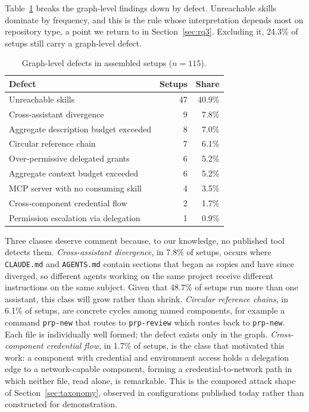 \documentclass[conference]{IEEEtran}
\begin{document}
Table~\ref{tab:setupscope} breaks the graph-level findings down by defect.
Unreachable skills dominate by frequency, and this is the rule whose
interpretation depends most on repository type, a point we return to in
Section~\ref{sec:rq3}. Excluding it, 24.3\% of setups still carry a graph-level
defect.

\begin{table}[t]
\caption{Graph-level defects in assembled setups ($n=115$).}
\label{tab:setupscope}
\centering
\small
\begin{tabular}{lrr}
\toprule
Defect & Setups & Share \\
\midrule
Unreachable skills                    & 47 & 40.9\% \\
Cross-assistant divergence            &  9 &  7.8\% \\
Aggregate description budget exceeded &  8 &  7.0\% \\
Circular reference chain              &  7 &  6.1\% \\
Over-permissive delegated grants      &  6 &  5.2\% \\
Aggregate context budget exceeded     &  6 &  5.2\% \\
MCP server with no consuming skill    &  4 &  3.5\% \\
Cross-component credential flow       &  2 &  1.7\% \\
Permission escalation via delegation  &  1 &  0.9\% \\
\bottomrule
\end{tabular}
\end{table}

Three classes deserve comment because, to our knowledge, no published tool
detects them. \emph{Cross-assistant divergence}, in 7.8\% of setups, occurs
where \texttt{CLAUDE.md} and \texttt{AGENTS.md} contain sections that began as
copies and have since diverged, so different agents working on the same project
receive different instructions on the same subject. Given that 48.7\% of setups
run more than one assistant, this class will grow rather than shrink.
\emph{Circular reference chains}, in 6.1\% of setups, are concrete cycles among
named components, for example a command \texttt{prp-new} that routes to
\texttt{prp-review} which routes back to \texttt{prp-new}. Each file is
individually well formed; the defect exists only in the graph.
\emph{Cross-component credential flow}, in 1.7\% of setups, is the class that
motivated this work: a component with credential and environment access holds a
delegation edge to a network-capable component, forming a credential-to-network
path in which neither file, read alone, is remarkable. This is the composed
attack shape of Section~\ref{sec:taxonomy}, observed in configurations published
today rather than constructed for demonstration.
\end{document}

